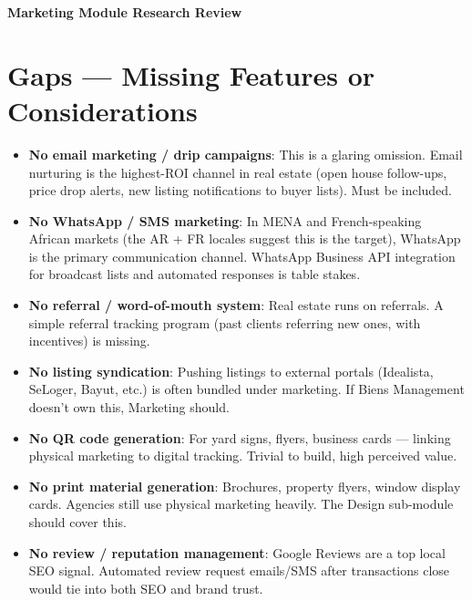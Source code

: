 \documentclass[12pt,a4paper]{article}
\begin{document}
\begin{center}
  {\LARGE\bfseries\color{resmoBlue} Marketing Module Research Review}
\end{center}

\vspace{1em}

\section{Gaps --- Missing Features or Considerations}

\begin{itemize}[leftmargin=1.5em, itemsep=0.5em]
  \item \textbf{No email marketing / drip campaigns}: This is a glaring omission. Email nurturing is the highest-ROI channel in real estate (open house follow-ups, price drop alerts, new listing notifications to buyer lists). Must be included.

  \item \textbf{No WhatsApp / SMS marketing}: In MENA and French-speaking African markets (the AR + FR locales suggest this is the target), WhatsApp is the primary communication channel. WhatsApp Business API integration for broadcast lists and automated responses is table stakes.

  \item \textbf{No referral / word-of-mouth system}: Real estate runs on referrals. A simple referral tracking program (past clients referring new ones, with incentives) is missing.

  \item \textbf{No listing syndication}: Pushing listings to external portals (Idealista, SeLoger, Bayut, etc.) is often bundled under marketing. If Biens Management doesn't own this, Marketing should.

  \item \textbf{No QR code generation}: For yard signs, flyers, business cards --- linking physical marketing to digital tracking. Trivial to build, high perceived value.

  \item \textbf{No print material generation}: Brochures, property flyers, window display cards. Agencies still use physical marketing heavily. The Design sub-module should cover this.

  \item \textbf{No review / reputation management}: Google Reviews are a top local SEO signal. Automated review request emails/SMS after transactions close would tie into both SEO and brand trust.


\end{itemize}
\end{document}
